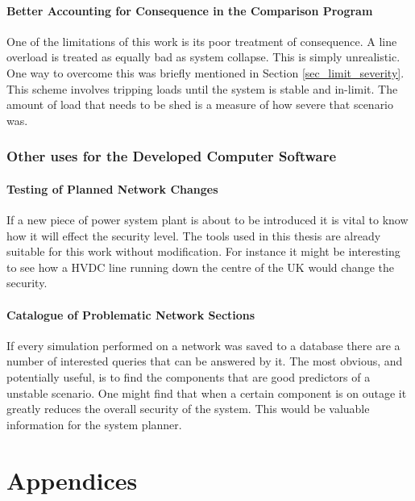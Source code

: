 \documentclass[a4paper,oneside,12pt]{report}
\begin{document}
\subsection{Better Accounting for Consequence in the Comparison Program}

One of the limitations of this work is its poor treatment of consequence. A line overload is treated as equally bad as system collapse. This is simply unrealistic. One way to overcome this was briefly mentioned in Section \ref{sec_limit_severity}. This scheme involves tripping loads until the system is stable and in-limit. The amount of load that needs to be shed is a measure of how severe that scenario was.



\section{Other uses for the Developed Computer Software}

\subsection{Testing of Planned Network Changes}

If a new piece of power system plant is about to be introduced it is vital to know how it will effect the security level. The tools used in this thesis are already suitable for this work without modification. For instance it might be interesting to see how a HVDC line running down the centre of the UK would change the security. 

\subsection{Catalogue of Problematic Network Sections}

If every simulation performed on a network was saved to a database there are a number of interested queries that can be answered by it. The most obvious, and potentially useful, is to find the components that are good predictors of a unstable scenario. One might find that when a certain component is on outage it greatly reduces the overall security of the system. This would be valuable information for the system planner.


\appendix

\part*{Appendices}
\end{document}
